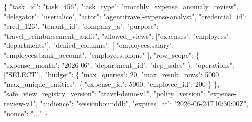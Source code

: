 \documentclass[journal]{IEEEtran}
\newenvironment{Shaded}{}{}
\newcommand{\DataTypeTok}[1]{\textcolor[rgb]{0.56,0.13,0.00}{#1}}
\newcommand{\DecValTok}[1]{\textcolor[rgb]{0.25,0.63,0.44}{#1}}
\newcommand{\FunctionTok}[1]{\textcolor[rgb]{0.02,0.16,0.49}{#1}}
\newcommand{\OtherTok}[1]{\textcolor[rgb]{0.00,0.44,0.13}{#1}}
\newcommand{\StringTok}[1]{\textcolor[rgb]{0.25,0.44,0.63}{#1}}
\begin{document}
\begin{Shaded}
\begin{Highlighting}[]
\FunctionTok{\{}
  \DataTypeTok{"task\_id"}\FunctionTok{:} \StringTok{"task\_456"}\FunctionTok{,}
  \DataTypeTok{"task\_type"}\FunctionTok{:} \StringTok{"monthly\_expense\_anomaly\_review"}\FunctionTok{,}
  \DataTypeTok{"delegator"}\FunctionTok{:} \StringTok{"user:alice"}\FunctionTok{,}
  \DataTypeTok{"actor"}\FunctionTok{:} \StringTok{"agent:travel{-}expense{-}analyst"}\FunctionTok{,}
  \DataTypeTok{"credential\_id"}\FunctionTok{:} \StringTok{"cred\_123"}\FunctionTok{,}
  \DataTypeTok{"tenant\_id"}\FunctionTok{:} \StringTok{"company\_a"}\FunctionTok{,}
  \DataTypeTok{"purpose"}\FunctionTok{:} \StringTok{"travel\_reimbursement\_audit"}\FunctionTok{,}
  \DataTypeTok{"allowed\_views"}\FunctionTok{:} \OtherTok{[}\StringTok{"expenses"}\OtherTok{,} \StringTok{"employees"}\OtherTok{,} \StringTok{"departments"}\OtherTok{]}\FunctionTok{,}
  \DataTypeTok{"denied\_columns"}\FunctionTok{:} \OtherTok{[}
    \StringTok{"employees.salary"}\OtherTok{,}
    \StringTok{"employees.bank\_account"}\OtherTok{,}
    \StringTok{"employees.phone"}
  \OtherTok{]}\FunctionTok{,}
  \DataTypeTok{"row\_scope"}\FunctionTok{:} \FunctionTok{\{}
    \DataTypeTok{"expense\_month"}\FunctionTok{:} \StringTok{"2026{-}06"}\FunctionTok{,}
    \DataTypeTok{"department\_id"}\FunctionTok{:} \StringTok{"dep\_sales"}
  \FunctionTok{\},}
  \DataTypeTok{"operations"}\FunctionTok{:} \OtherTok{[}\StringTok{"SELECT"}\OtherTok{]}\FunctionTok{,}
  \DataTypeTok{"budget"}\FunctionTok{:} \FunctionTok{\{}
    \DataTypeTok{"max\_queries"}\FunctionTok{:} \DecValTok{20}\FunctionTok{,}
    \DataTypeTok{"max\_result\_rows"}\FunctionTok{:} \DecValTok{5000}\FunctionTok{,}
    \DataTypeTok{"max\_unique\_entities"}\FunctionTok{:} \FunctionTok{\{}
      \DataTypeTok{"expense\_id"}\FunctionTok{:} \DecValTok{5000}\FunctionTok{,}
      \DataTypeTok{"employee\_id"}\FunctionTok{:} \DecValTok{200}
    \FunctionTok{\}}
  \FunctionTok{\},}
  \DataTypeTok{"safe\_view\_registry\_version"}\FunctionTok{:} \StringTok{"travel{-}demo{-}v1"}\FunctionTok{,}
  \DataTypeTok{"policy\_version"}\FunctionTok{:} \StringTok{"expense{-}review{-}v1"}\FunctionTok{,}
  \DataTypeTok{"audience"}\FunctionTok{:} \StringTok{"sessionbounddb"}\FunctionTok{,}
  \DataTypeTok{"expires\_at"}\FunctionTok{:} \StringTok{"2026{-}06{-}24T10:30:00Z"}\FunctionTok{,}
  \DataTypeTok{"nonce"}\FunctionTok{:} \StringTok{"..."}
\FunctionTok{\}}
\end{Highlighting}
\end{Shaded}
\end{document}
